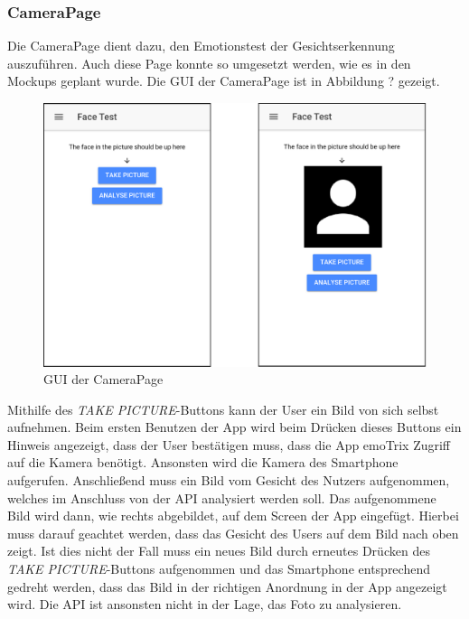 \subsubsection{CameraPage}
Die CameraPage dient dazu, den Emotionstest der Gesichtserkennung auszuführen. Auch diese Page konnte so umgesetzt werden, wie es in den Mockups geplant wurde. Die GUI der CameraPage ist in Abbildung ? gezeigt. \newline
\begin{figure}[h]
	\centering
	\includegraphics[width=13.5cm]{Bilder/camerapage.png}
	\caption[GUI der HomePage]{GUI der CameraPage}
\end{figure}%
\newline
Mithilfe des \textit{TAKE PICTURE}-Buttons kann der User ein Bild von sich selbst aufnehmen. Beim ersten Benutzen der App wird beim Drücken dieses Buttons ein Hinweis angezeigt, dass der User bestätigen muss, dass die App emoTrix Zugriff auf die Kamera benötigt. Ansonsten wird die Kamera des Smartphone aufgerufen. Anschließend muss ein Bild vom Gesicht des Nutzers aufgenommen, welches im Anschluss von der API analysiert werden soll. Das aufgenommene Bild wird dann, wie rechts abgebildet, auf dem Screen der App eingefügt. Hierbei muss darauf geachtet werden, dass das Gesicht des Users auf dem Bild nach oben zeigt. Ist dies nicht der Fall muss ein neues Bild durch erneutes Drücken des \textit{TAKE PICTURE}-Buttons aufgenommen und das Smartphone entsprechend gedreht werden, dass das Bild in der richtigen Anordnung in der App angezeigt wird. Die API ist ansonsten nicht in der Lage, das Foto zu analysieren. \newline
